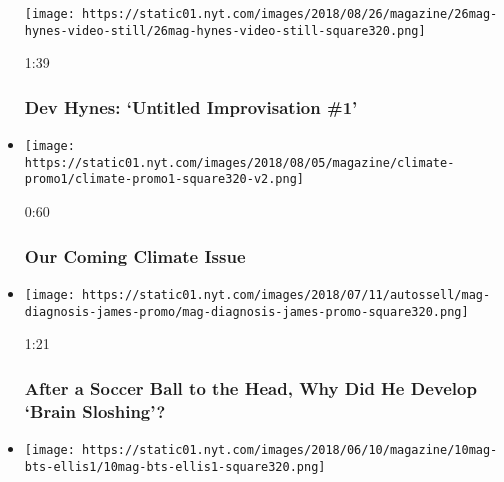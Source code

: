 \begin{itemize}
  \texttt{[image: https://static01.nyt.com/images/2018/08/26/magazine/26mag-hynes-video-still/26mag-hynes-video-still-square320.png]}

  1:39

  \hypertarget{dev-hynes-untitled-improvisation-1}{%
  \subsubsection{Dev Hynes: `Untitled Improvisation
  \#1'}\label{dev-hynes-untitled-improvisation-1}}
\item
  \href{https://www.nytimes.com/video/magazine/100000006025347/our-coming-climate-issue.html?action=click\&module=video-series-bar\&region=header\&pgtype=Article\&playlistId=video/magazine}{}

  \texttt{[image: https://static01.nyt.com/images/2018/08/05/magazine/climate-promo1/climate-promo1-square320-v2.png]}

  0:60

  \hypertarget{our-coming-climate-issue}{%
  \subsubsection{Our Coming Climate
  Issue}\label{our-coming-climate-issue}}
\item
  \href{https://www.nytimes.com/video/magazine/100000006000313/after-taking-a-soccer-ball-to-the-head-an-18-year-old-student-develops-a-mental-fogginess.html?action=click\&module=video-series-bar\&region=header\&pgtype=Article\&playlistId=video/magazine}{}

  \texttt{[image: https://static01.nyt.com/images/2018/07/11/autossell/mag-diagnosis-james-promo/mag-diagnosis-james-promo-square320.png]}

  1:21

  \hypertarget{after-a-soccer-ball-to-the-head-why-did-he-develop-brain-sloshing}{%
  \subsubsection{After a Soccer Ball to the Head, Why Did He Develop
  `Brain
  Sloshing'?}\label{after-a-soccer-ball-to-the-head-why-did-he-develop-brain-sloshing}}
\item
  \href{https://www.nytimes.com/video/magazine/100000005939102/new-york-issue-behind-the-scenes.html?action=click\&module=video-series-bar\&region=header\&pgtype=Article\&playlistId=video/magazine}{}

  \texttt{[image: https://static01.nyt.com/images/2018/06/10/magazine/10mag-bts-ellis1/10mag-bts-ellis1-square320.png]}


\end{itemize}

